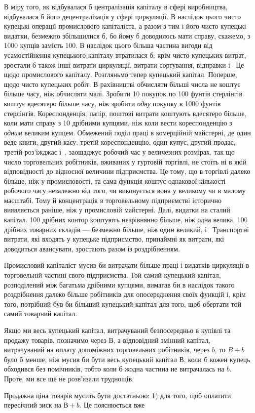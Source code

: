 \parcont{}  %
В міру того, як відбувалася б централізація капіталу в сфері
виробництва, відбувалася б його децентралізація у сфері циркуляції.
В наслідок цього чисто купецькі операції промислового
капіталіста, а разом з тим і його чисто купецькі видатки, безмежно
збільшилися б, бо йому б доводилось мати справу, скажемо,
з 1000 купців замість 100. В наслідок цього більша частина
вигоди від усамостійнення купецького капіталу втратилася б;
крім чисто купецьких витрат, зростали б також інші витрати
циркуляції, витрати сортування, відправки і~ Це щодо промислового
капіталу. Розгляньмо тепер купецький капітал. Поперше,
щодо чисто купецьких робіт. В рахівництві обчисляти
більші числа не коштує більше часу, ніж обчисляти малі. Зробити
10 покупок по 100 фунтів стерлінгів коштує вдесятеро більше
часу, ніж зробити \emph{одну} покупку в 1000 фунтів стерлінгів. Кореспонденція,
папір, поштові витрати коштують вдесятеро більше,
коли мати справу з 10 дрібними купцями, ніж коли вести кореспонденцію
з \emph{одним} великим купцем. Обмежений поділ праці в комерційній
майстерні, де один веде книги, другий касу, третій
кореспонденцію, один купує, другий продає, третій роз’їжджає
і~, заощаджує робочий час у величезних розмірах, так що
число торговельних робітників, вживаних у гуртовій торгівлі,
не стоїть ні в якій відповідності до відносної величини підприємства.
Це тому, що в торгівлі далеко більше, ніж у промисловості,
та сама функція коштує однакової кількості робочого часу
незалежно від того, чи виконується вона у великому чи в малому
масштабі. Тому й концентрація в торговельному підприємстві
історично виявляється раніше, ніж у промисловій майстерні.
Далі, видатки на сталий капітал. 100 дрібних контор коштують
незрівнянно більше, ніж одна велика, 100 дрібних товарних складів
— безмежно більше, ніж один великий, і~ Транспортні витрати,
які входять у купецьке підприємство, принаймні як витрати,
які доводиться авансувати, зростають разом із роздрібненням.

Промисловий капіталіст мусив би витрачати більше праці
і видатків циркуляції в торговельній частині свого підприємства.
Той самий купецький капітал, розподілений між багатьма дрібними
купцями, вимагав би в наслідок такого роздрібнення далеко
більше робітників для опосереднення своїх функцій і, крім
того, потрібний був би більший купецький капітал для того,
щоб обертати той самий товарний капітал.

Якщо ми весь купецький капітал, витрачуваний безпосередньо
в купівлі та продажу товарів, позначимо через $В$, а відповідний
змінний капітал, витрачуваний на оплату допоміжних торговельних
робітників, через $b$, то $B + b$ було б менше, ніж мусив би
бути весь купецький капітал В, коли б кожен купець обходився
без помічників, тобто коли б жодна частина не витрачалась на $b$.
Проте, ми все ще не розв’язали труднощів.

Продажна ціна товарів мусить бути достатньою: 1) для того,
щоб оплатити пересічний зиск на $В + b$. Це пояснюється вже
\parbreak{}  %
